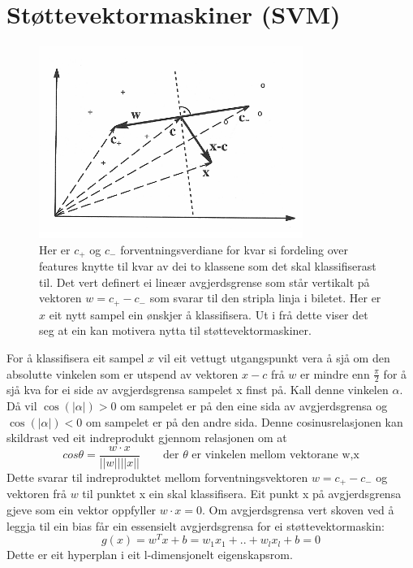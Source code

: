 \documentclass[oneside, nynorsk]{book}
\begin{document}
\section{Støttevektormaskiner (SVM)}
\begin{figure}[h!]
    \centering
    \centerline{\includegraphics[width=0.6\linewidth]{SVM}}
    \caption{Her er $c_{+}$ og $c_{-}$ forventningsverdiane for kvar si fordeling over features knytte til kvar av dei to klassene som det skal klassifiserast til.
    Det vert definert ei lineær avgjerdsgrense som står vertikalt på vektoren $w=c_{+}-c_{-}$ som svarar til den stripla linja i biletet.
    Her er $x$ eit nytt sampel ein ønskjer å klassifisera. Ut i frå dette viser det seg at ein kan motivera nytta til støttevektormaskiner.}
    \label{SVM}
\end{figure}
For å klassifisera eit sampel $x$ vil eit vettugt utgangspunkt vera å sjå om den absolutte vinkelen som er utspend av vektoren $x-c$ frå $w$ er mindre enn $\frac{\pi}{2}$ for å sjå kva for ei side av avgjerdsgrensa sampelet x finst på.
Kall denne vinkelen $\alpha$. Då vil $\cos(|\alpha|)>0$ om sampelet er på den eine sida av avgjerdsgrensa og $\cos(|\alpha|)<0$ om sampelet er på den andre sida.
Denne cosinusrelasjonen kan skildrast ved eit indreprodukt gjennom relasjonen om at
\[cos \theta = \frac{w \cdot x}{||w|| ||x||} \qquad \text{der $\theta$ er vinkelen mellom vektorane w,x}\]
Dette svarar til indreproduktet mellom forventningsvektoren $w=c_{+}-c_{-}$ og vektoren frå $w$ til
punktet x ein skal klassifisera. Eit punkt x på avgjerdsgrensa gjeve som ein vektor oppfyller $w\cdot x=0$.
Om avgjerdsgrensa vert skoven ved å leggja til ein bias får ein essensielt avgjerdsgrensa for ei støttevektormaskin:
\[g(x)=w^Tx + b=w_1x_1+..+w_lx_l+b=0\]
Dette er eit hyperplan i eit l-dimensjonelt eigenskapsrom.
\end{document}
